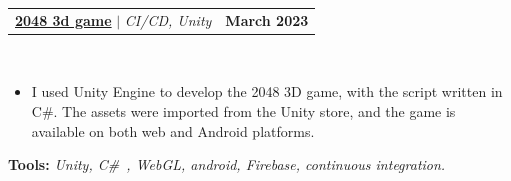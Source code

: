 \documentclass[letterpaper,11pt]{article}
\makeatletter
\newcommand{\resumeItem}[1]{
  \item\small{
    {#1 \vspace{-2pt}}
  }
}
\newcommand{\resumeProjectHeading}[2]{
    \item
    \begin{tabular*}{1.001\textwidth}{l@{\extracolsep{\fill}}r}
      \small#1 & \textbf{\small #2}\\
    \end{tabular*}\vspace{-7pt}
}
\newcommand{\resumeItemListStart}{\begin{itemize}}
\newcommand{\resumeItemListEnd}{\end{itemize}\vspace{-5pt}}
\makeatother
\begin{document}
        \vspace{-18pt}
 
                

 \resumeProjectHeading
          {\textbf{\href{https://github.com/yakkshit/2048-3d-master.git}{2048 3d game}} $|$ \emph{CI/CD, Unity \faGithub}}{March 2023}\\
          \vspace{9pt}
          \vspace{-8pt}
          \resumeItemListStart
            \resumeItem{I used Unity Engine to develop the 2048 3D game, with the script written in C#. The assets were imported from the Unity store, and the game is available on both web and Android platforms.}
          \resumeItemListEnd 
          \textbf{Tools:}\emph{
                                Unity, C\#\ , WebGL, android, Firebase, continuous integration.}

    \vspace{-18pt}

                


\end{document}

